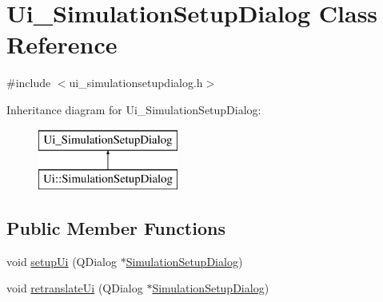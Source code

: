 \hypertarget{class_ui___simulation_setup_dialog}{}\section{Ui\+\_\+\+Simulation\+Setup\+Dialog Class Reference}
\label{class_ui___simulation_setup_dialog}


{\ttfamily \#include $<$ui\+\_\+simulationsetupdialog.\+h$>$}

Inheritance diagram for Ui\+\_\+\+Simulation\+Setup\+Dialog\+:\begin{figure}[H]
\begin{center}
\leavevmode
\includegraphics[height=2.000000cm]{d0/dea/class_ui___simulation_setup_dialog}
\end{center}
\end{figure}
\subsection*{Public Member Functions}
\begin{DoxyCompactItemize}
\item 
void \mbox{\hyperlink{class_ui___simulation_setup_dialog_a8ccb70507ecd528a4fd907aede032ec5}{setup\+Ui}} (Q\+Dialog $\ast$\mbox{\hyperlink{class_simulation_setup_dialog}{Simulation\+Setup\+Dialog}})
\item 
void \mbox{\hyperlink{class_ui___simulation_setup_dialog_a206b89b3c7f9bd62cb227f8e40c76031}{retranslate\+Ui}} (Q\+Dialog $\ast$\mbox{\hyperlink{class_simulation_setup_dialog}{Simulation\+Setup\+Dialog}})
\end{DoxyCompactItemize}
